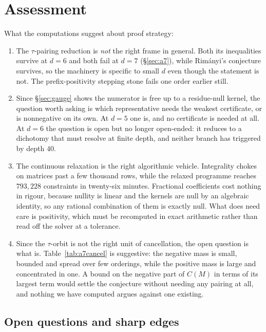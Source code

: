 \documentclass[11pt,a4paper]{article}
\theoremstyle{plain}
\theoremstyle{definition}
\theoremstyle{remark}
\begin{document}
\section{Assessment}
\label{sec:assessment}

What the computations suggest about proof strategy:

\begin{enumerate}[itemsep=3pt,topsep=3pt]
\item The $\tau$-pairing reduction is \emph{not} the right frame in general.  Both its
  inequalities survive at $d = 6$ and both fail at $d = 7$ (\S\ref{sec:a7}), while Rim\'anyi's
  conjecture survives, so the machinery is specific to small $d$ even though the statement is not.
  The prefix-positivity stepping stone fails one order earlier still.
\item Since \S\ref{sec:gauge} shows the numerator is free up to a residue-null kernel,
  the question worth asking is which representative needs the weakest certificate, or is
  nonnegative on its own. At $d = 5$ one is, and no certificate is needed at all. At $d = 6$ the
  question is open but no longer open-ended: it reduces to a dichotomy that must resolve at
  finite depth, and neither branch has triggered by depth $40$.
\item The continuous relaxation is the right algorithmic vehicle. Integrality chokes on
  matrices past a few thousand rows, while the relaxed programme reaches $793{,}228$ constraints
  in twenty-six minutes. Fractional coefficients cost nothing in rigour, because nullity is
  linear and the kernels are null by an algebraic identity, so any rational combination of them
  is exactly null. What does need care is positivity, which must be recomputed in exact
  arithmetic rather than read off the solver at a tolerance.
\item Since the $\tau$-orbit is not the right unit of cancellation, the open question is what is.
  Table~\ref{tab:a7cancel} is suggestive: the negative mass is small, bounded and spread over few
  orderings, while the positive mass is large and concentrated in one.  A bound on the negative
  part of $C(M)$ in terms of its largest term would settle the conjecture without needing any
  pairing at all, and nothing we have computed argues against one existing.
\end{enumerate}

\subsection{Open questions and sharp edges}
\end{document}
